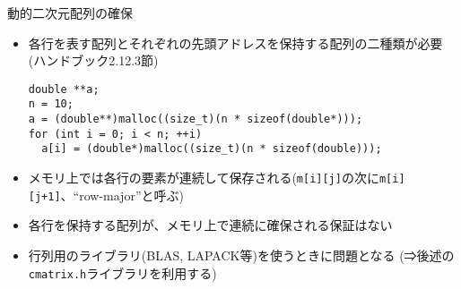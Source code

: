 \begin{frame}[t,fragile]{動的二次元配列の確保}
  \begin{itemize}
  \item 各行を表す配列とそれぞれの先頭アドレスを保持する配列の二種類が必要 (ハンドブック2.12.3節)
    \begin{lstlisting}
double **a;
n = 10;  
a = (double**)malloc((size_t)(n * sizeof(double*)));
for (int i = 0; i < n; ++i)
  a[i] = (double*)malloc((size_t)(n * sizeof(double)));
    \end{lstlisting}
  \item メモリ上では各行の要素が連続して保存される(\verb+m[i][j]+の次に\verb!m[i][j+1]!、``row-major''と呼ぶ)
  \item 各行を保持する配列が、メモリ上で連続に確保される保証はない
  \item 行列用のライブラリ(BLAS, LAPACK等)を使うときに問題となる (⇒後述の\verb+cmatrix.h+ライブラリを利用する)
  \end{itemize}
\end{frame}
